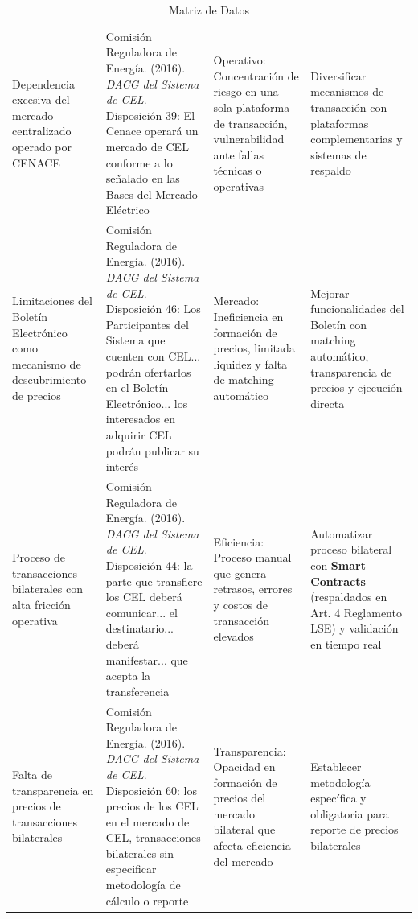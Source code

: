 \documentclass{cel}
\begin{document}
\vspace{0.3cm}
\begin{tabladoradoLargo}
\renewcommand{\tabularxcolumn}[1]{p{#1}}
\begin{xltabular}{\textwidth}{|X|X|X|X|}
\caption{Matriz de Datos} \\
\toprule
{}  &  &  &  \\
\midrule
\endhead
Dependencia excesiva del mercado centralizado operado por CENACE & Comisión Reguladora de Energía. (2016). \textit{DACG del Sistema de CEL}. Disposición 39: \textquotedbl{}El Cenace operará un mercado de CEL conforme a lo señalado en las Bases del Mercado Eléctrico\textquotedbl{} & Operativo: Concentración de riesgo en una sola plataforma de transacción, vulnerabilidad ante fallas técnicas o operativas & Diversificar mecanismos de transacción con plataformas complementarias y sistemas de respaldo \\ \hline
Limitaciones del Boletín Electrónico como mecanismo de descubrimiento de precios & Comisión Reguladora de Energía. (2016). \textit{DACG del Sistema de CEL}. Disposición 46: \textquotedbl{}Los Participantes del Sistema que cuenten con CEL... podrán ofertarlos en el Boletín Electrónico... los interesados en adquirir CEL podrán publicar su interés\textquotedbl{} & Mercado: Ineficiencia en formación de precios, limitada liquidez y falta de matching automático & Mejorar funcionalidades del Boletín con matching automático, transparencia de precios y ejecución directa \\ \hline
Proceso de transacciones bilaterales con alta fricción operativa & Comisión Reguladora de Energía. (2016). \textit{DACG del Sistema de CEL}. Disposición 44: \textquotedbl{}la parte que transfiere los CEL deberá comunicar... el destinatario... deberá manifestar... que acepta la transferencia\textquotedbl{} & Eficiencia: Proceso manual que genera retrasos, errores y costos de transacción elevados & Automatizar proceso bilateral con \textbf{Smart Contracts} (respaldados en Art. 4 Reglamento LSE) y validación en tiempo real \\ \hline
Falta de transparencia en precios de transacciones bilaterales & Comisión Reguladora de Energía. (2016). \textit{DACG del Sistema de CEL}. Disposición 60: \textquotedbl{}los precios de los CEL en el mercado de CEL, transacciones bilaterales\textquotedbl{} sin especificar metodología de cálculo o reporte & Transparencia: Opacidad en formación de precios del mercado bilateral que afecta eficiencia del mercado & Establecer metodología específica y obligatoria para reporte de precios bilaterales \\ \hline

\end{xltabular}
\end{tabladoradoLargo}
\end{document}
